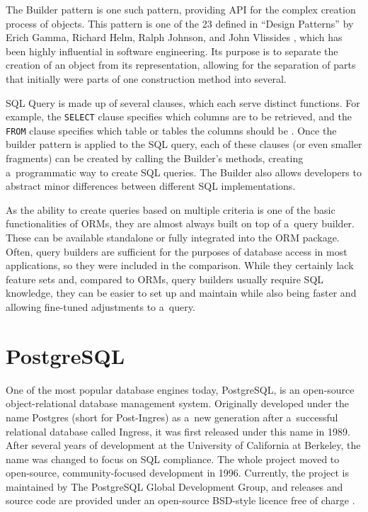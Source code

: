 The Builder pattern is one such pattern, providing API for the complex creation
process of objects. This pattern is one of the 23 defined in \enquote{Design
Patterns} by Erich Gamma, Richard Helm, Ralph Johnson, and John Vlissides
\cite{gamma-design-1995}, which has been highly influential in software
engineering. Its purpose is to separate the creation of an object from its
representation, allowing for the separation of parts that initially were parts
of one construction method into several.

SQL Query is made up of several clauses, which each serve distinct functions.
For example, the \texttt{SELECT} clause specifies which columns are to be
retrieved, and the \texttt{FROM} clause specifies which table or tables the
columns should be \cite{postgres-lexer}. Once the builder pattern is applied to
the SQL query, each of these clauses (or even smaller fragments) can be created
by calling the Builder's methods, creating a~programmatic way to create SQL
queries. The Builder also allows developers to abstract minor differences
between different SQL implementations.

As the ability to create queries based on multiple criteria is one of the basic
functionalities of ORMs, they are almost always built on top of a~query builder.
These can be available standalone or fully integrated into the ORM package.
Often, query builders are sufficient for the purposes of database access in most
applications, so they were included in the comparison. While they certainly lack
feature sets and, compared to ORMs, query builders usually require SQL
knowledge, they can be easier to set up and maintain while also being faster and
allowing fine-tuned adjustments to a~query.

\section*{PostgreSQL}
One of the most popular database engines today, PostgreSQL, is an open-source
object-relational database management system. Originally developed under the
name Postgres \cite{postres-about} (short for Post-Ingres) as a~new generation
after a~successful relational database called Ingress, it was first released
under this name in 1989. After several years of development at the University of
California at Berkeley, the name was changed to focus on SQL compliance. The
whole project moved to open-source, community-focused development in 1996.
Currently, the project is maintained by The PostgreSQL Global Development Group,
and releases and source code are provided under an open-source BSD-style licence
free of charge \cite{postgres-licence}.

